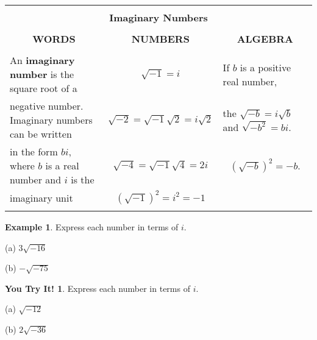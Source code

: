 \documentclass{report}
\theoremstyle{definition}
\newtheorem{example}{\bf Example}
\newtheorem{youtry}{\textbf{You Try It!}}
\begin{document}
\begin{center}
	\begin{tabular}{|l|l|l|}
		\hline
		\multicolumn{3}{|l|}{}\\
		\multicolumn{3}{|c|}{\large\textbf{Imaginary Numbers} \normalsize}\\
		\hline
		&&\\
		\multicolumn{1}{|c|}{\textbf{WORDS}}&\multicolumn{1}{c|}{\textbf{NUMBERS}}&\multicolumn{1}{c|}{\textbf{ALGEBRA}}\\
		\hline
		&&\\
		An \textbf{imaginary number} is the square root of a & \multicolumn{1}{c|}{$\sqrt{-1}=i$} & If $b$ is a positive real number,\\
		negative number. Imaginary numbers can be written& \multicolumn{1}{c|}{$\sqrt{-2}=\sqrt{-1}\sqrt{2}=i\sqrt{2}$}&  the $\sqrt{-b}=i\sqrt{b}$ and $\sqrt{-b^2}=bi.$ \\
		in the form $bi$, where $b$ is a real number and $i$ is the& \multicolumn{1}{c|}{$\sqrt{-4}=\sqrt{-1}\sqrt{4}=2i$}  & \multicolumn{1}{c|}{$(\sqrt{-b})^2=-b$.}  \\
		imaginary unit& \multicolumn{1}{c|}{$(\sqrt{-1})^2=i^2=-1$} &  \\
		& & \\
		\hline
	\end{tabular}
\end{center}


\begin{example}
Express each number in terms of $i$.
\end{example}

\vspace{-0.25cm}

\begin{minipage}[t]{0.45\linewidth}
(a) $3\sqrt{-16}$
\end{minipage}
\hfill
\begin{minipage}[t]{0.45\linewidth}
(b) $-\sqrt{-75}$
\end{minipage}

\vspace{0.75cm}

\begin{youtry}
Express each number in terms of $i$.
\end{youtry}

\vspace{-0.25cm}

\begin{minipage}[t]{0.45\linewidth}
(a) $\sqrt{-12}$
\end{minipage}
\hfill
\begin{minipage}[t]{0.45\linewidth}
(b) $2\sqrt{-36}$
\end{minipage}
\end{document}
